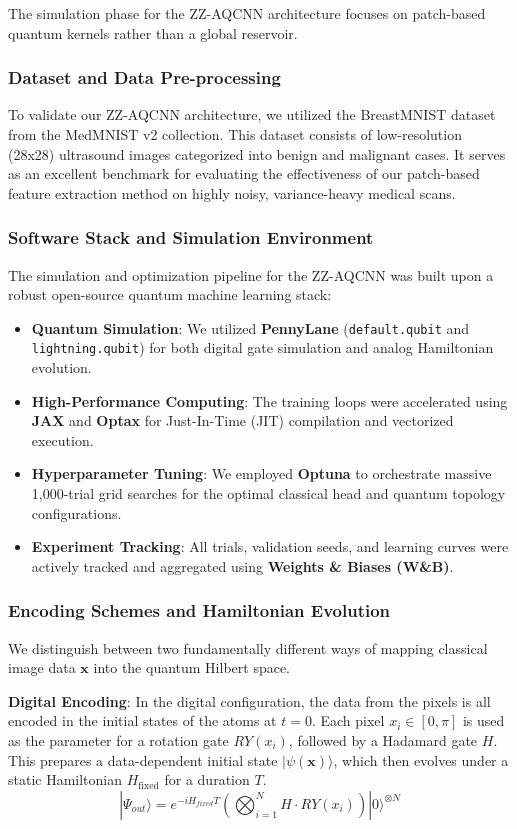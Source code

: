 \documentclass{oqireport}
\begin{document}
The simulation phase for the ZZ-AQCNN architecture focuses on patch-based quantum kernels rather than a global reservoir.

\subsubsection{Dataset and Data Pre-processing}
To validate our ZZ-AQCNN architecture, we utilized the BreastMNIST dataset from the MedMNIST v2 collection. This dataset consists of low-resolution (28x28) ultrasound images categorized into benign and malignant cases. It serves as an excellent benchmark for evaluating the effectiveness of our patch-based feature extraction method on highly noisy, variance-heavy medical scans.

\subsubsection{Software Stack and Simulation Environment}
The simulation and optimization pipeline for the ZZ-AQCNN was built upon a robust open-source quantum machine learning stack:
\begin{itemize}
    \item \textbf{Quantum Simulation}: We utilized \textbf{PennyLane} (\texttt{default.qubit} and \texttt{lightning.qubit}) for both digital gate simulation and analog Hamiltonian evolution.
    \item \textbf{High-Performance Computing}: The training loops were accelerated using \textbf{JAX} and \textbf{Optax} for Just-In-Time (JIT) compilation and vectorized execution.
    \item \textbf{Hyperparameter Tuning}: We employed \textbf{Optuna} to orchestrate massive 1,000-trial grid searches for the optimal classical head and quantum topology configurations.
    \item \textbf{Experiment Tracking}: All trials, validation seeds, and learning curves were actively tracked and aggregated using \textbf{Weights \& Biases (W\&B)}.
\end{itemize}

\subsubsection{Encoding Schemes and Hamiltonian Evolution}
We distinguish between two fundamentally different ways of mapping classical image data $\mathbf{x}$ into the quantum Hilbert space.

\textbf{Digital Encoding}: In the digital configuration, the data from the pixels is all encoded in the initial states of the atoms at $t=0$. Each pixel $x_i \in [0, \pi]$ is used as the parameter for a rotation gate $RY(x_i)$, followed by a Hadamard gate $H$. This prepares a data-dependent initial state $|\psi(\mathbf{x})\rangle$, which then evolves under a static Hamiltonian $H_{\text{fixed}}$ for a duration $T$.
\begin{equation}
|\Psi_{out}\rangle = e^{-i H_{fixed} T} \left( \bigotimes_{i=1}^N H \cdot RY(x_i) \right) |0\rangle^{\otimes N}
\end{equation}
\end{document}
